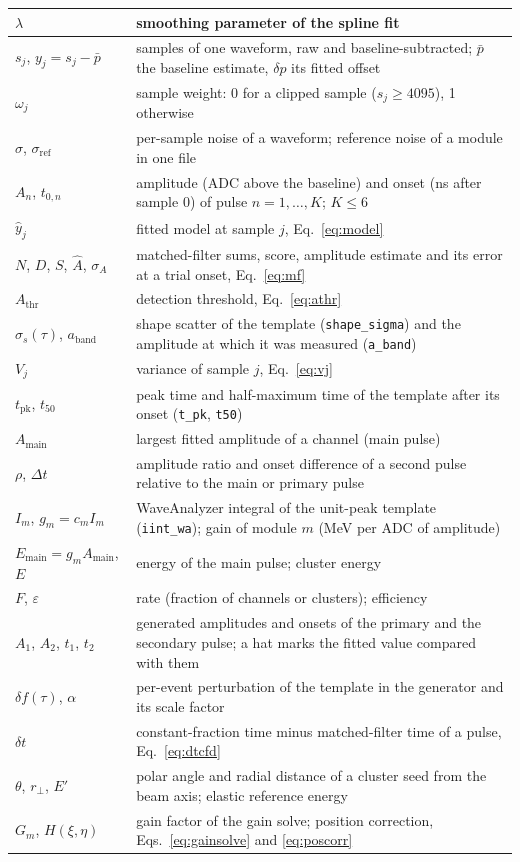 \documentclass[11pt]{article}
\newcommand{\code}[1]{\texttt{#1}}
\begin{document}
\begin{table}[htbp]
\begin{tabular}{lp{}}
$\lambda$ & smoothing parameter of the spline fit \\
\midrule
$s_j$, $y_j = s_j - \bar p$ & samples of one waveform, raw and baseline-subtracted; $\bar p$ the baseline estimate, $\delta p$ its fitted offset \\
$\omega_j$ & sample weight: 0 for a clipped sample ($s_j \ge 4095$), 1 otherwise \\
$\sigma$, $\sigma_{\mathrm{ref}}$ & per-sample noise of a waveform; reference noise of a module in one file \\
$A_n$, $t_{0,n}$ & amplitude (ADC above the baseline) and onset (ns after sample 0) of pulse $n = 1,\dots,K$; $K \le 6$ \\
$\hat y_j$ & fitted model at sample $j$, Eq.~\eqref{eq:model} \\
$N$, $D$, $S$, $\hat A$, $\sigma_A$ & matched-filter sums, score, amplitude estimate and its error at a trial onset, Eq.~\eqref{eq:mf} \\
$A_{\mathrm{thr}}$ & detection threshold, Eq.~\eqref{eq:athr} \\
$\sigma_s(\tau)$, $a_{\mathrm{band}}$ & shape scatter of the template (\code{shape\_sigma}) and the amplitude at which it was measured (\code{a\_band}) \\
$V_j$ & variance of sample $j$, Eq.~\eqref{eq:vj} \\
$t_{\mathrm{pk}}$, $t_{50}$ & peak time and half-maximum time of the template after its onset (\code{t\_pk}, \code{t50}) \\
$A_{\mathrm{main}}$ & largest fitted amplitude of a channel (main pulse) \\
$\rho$, $\Delta t$ & amplitude ratio and onset difference of a second pulse relative to the main or primary pulse \\
$I_m$, $g_m = c_m I_m$ & WaveAnalyzer integral of the unit-peak template (\code{iint\_wa}); gain of module $m$ (MeV per ADC of amplitude) \\
$E_{\mathrm{main}} = g_m A_{\mathrm{main}}$, $E$ & energy of the main pulse; cluster energy \\
$F$, $\varepsilon$ & rate (fraction of channels or clusters); efficiency \\
$A_1$, $A_2$, $t_1$, $t_2$ & generated amplitudes and onsets of the primary and the secondary pulse; a hat marks the fitted value compared with them \\
$\delta f(\tau)$, $\alpha$ & per-event perturbation of the template in the generator and its scale factor \\
$\delta t$ & constant-fraction time minus matched-filter time of a pulse, Eq.~\eqref{eq:dtcfd} \\
$\theta$, $r_\perp$, $E'$ & polar angle and radial distance of a cluster seed from the beam axis; elastic reference energy \\
$G_m$, $H(\xi, \eta)$ & gain factor of the gain solve; position correction, Eqs.~\eqref{eq:gainsolve} and \eqref{eq:poscorr} \\
\bottomrule
\end{tabular}
\end{table}
\end{document}
